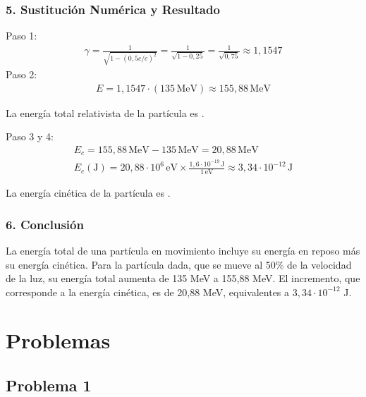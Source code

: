 \subsubsection*{5. Sustitución Numérica y Resultado}
Paso 1:
\begin{gather}
    \gamma = \frac{1}{\sqrt{1 - (0,5c/c)^2}} = \frac{1}{\sqrt{1 - 0,25}} = \frac{1}{\sqrt{0,75}} \approx 1,1547
\end{gather}
Paso 2:
\begin{gather}
    E = 1,1547 \cdot (135 \, \text{MeV}) \approx 155,88 \, \text{MeV}
\end{gather}
\begin{cajaresultado}
    La energía total relativista de la partícula es .
\end{cajaresultado}
Paso 3 y 4:
\begin{gather}
    E_c = 155,88 \, \text{MeV} - 135 \, \text{MeV} = 20,88 \, \text{MeV} \\
    E_c (\text{J}) = 20,88 \cdot 10^6 \, \text{eV} \times \frac{1,6 \cdot 10^{-19} \, \text{J}}{1 \, \text{eV}} \approx 3,34 \cdot 10^{-12} \, \text{J}
\end{gather}
\begin{cajaresultado}
    La energía cinética de la partícula es .
\end{cajaresultado}

\subsubsection*{6. Conclusión}
\begin{cajaconclusion}
La energía total de una partícula en movimiento incluye su energía en reposo más su energía cinética. Para la partícula dada, que se mueve al 50\% de la velocidad de la luz, su energía total aumenta de 135 MeV a 155,88 MeV. El incremento, que corresponde a la energía cinética, es de 20,88 MeV, equivalentes a $3,34 \cdot 10^{-12}$ J.
\end{cajaconclusion}
\newpage
\section{Problemas}
\label{sec:problemas_2021_jul_ext}

\subsection{Problema 1}
\label{subsec:P1_2021_jul_ext}

